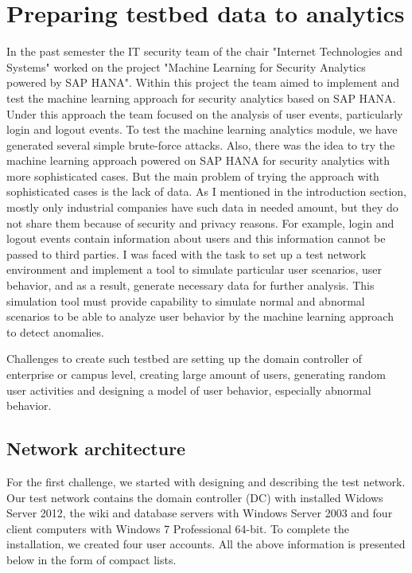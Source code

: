\section{Preparing testbed data to analytics}
In the past semester the IT security team of the chair "Internet Technologies and Systems" worked on the project "Machine Learning for Security Analytics powered by SAP HANA". Within this project the team aimed to implement and test the machine learning approach for security analytics based on SAP HANA. Under this approach the team focused on the analysis of user events, particularly login and logout events. To test the machine learning analytics module, we have generated several simple brute-force attacks. Also, there was the idea to try the machine learning approach powered on SAP HANA for security analytics with more sophisticated cases. But the main problem of trying the approach with sophisticated cases is the lack of data. As I mentioned in the introduction section, mostly only industrial companies have such data in needed amount, but they do not share them because of security and privacy reasons. For example, login and logout events contain information about users and this information cannot be passed to third parties. I was faced with the task to set up a test network environment and implement a tool to simulate particular user scenarios, user behavior, and as a result, generate necessary data for further analysis. This simulation tool must provide capability to simulate normal and abnormal scenarios to be able to analyze user behavior by the machine learning approach to detect anomalies.  

Challenges to create such testbed are setting up the domain controller of enterprise or campus level, creating large amount of users, generating random user activities and designing a model of user behavior, especially abnormal behavior.
  
\subsection{Network architecture}
For the first challenge, we started with designing and describing the test network. Our test network contains the domain controller (DC) with installed Widows Server 2012, the wiki and database servers with Windows Server 2003 and four client computers with Windows 7 Professional 64-bit. To complete the installation, we created four user accounts. All the above information is presented below in the form of compact lists.

